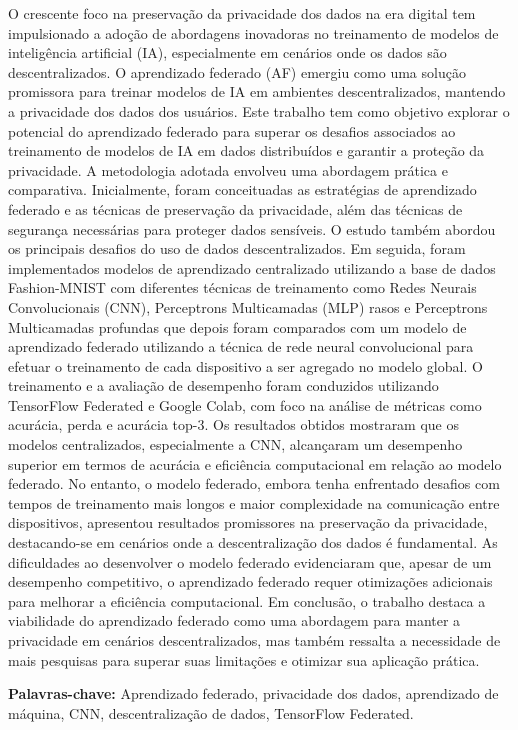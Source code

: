 \begin{resumo}

O crescente foco na preservação da privacidade dos dados na era digital tem impulsionado a adoção de abordagens inovadoras no treinamento de modelos de inteligência artificial (IA), especialmente em cenários onde os dados são descentralizados. O aprendizado federado (AF) emergiu como uma solução promissora para treinar modelos de IA em ambientes descentralizados, mantendo a privacidade dos dados dos usuários. Este trabalho tem como objetivo explorar o potencial do aprendizado federado para superar os desafios associados ao treinamento de modelos de IA em dados distribuídos e garantir a proteção da privacidade. A metodologia adotada envolveu uma abordagem prática e comparativa. Inicialmente, foram conceituadas as estratégias de aprendizado federado e as técnicas de preservação da privacidade, além das técnicas de segurança necessárias para proteger dados sensíveis. O estudo também abordou os principais desafios do uso de dados descentralizados. Em seguida, foram implementados modelos de aprendizado centralizado utilizando a base de dados Fashion-MNIST com diferentes técnicas de treinamento como Redes Neurais Convolucionais (CNN), Perceptrons Multicamadas (MLP) rasos e Perceptrons Multicamadas profundas que depois foram comparados com um modelo de aprendizado federado utilizando a técnica de rede neural convolucional para efetuar o treinamento de cada dispositivo a ser agregado no modelo global. O treinamento e a avaliação de desempenho foram conduzidos utilizando TensorFlow Federated e Google Colab, com foco na análise de métricas como acurácia, perda e acurácia top-3. Os resultados obtidos mostraram que os modelos centralizados, especialmente a CNN, alcançaram um desempenho superior em termos de acurácia e eficiência computacional em relação ao modelo federado. No entanto, o modelo federado, embora tenha enfrentado desafios com tempos de treinamento mais longos e maior complexidade na comunicação entre dispositivos, apresentou resultados promissores na preservação da privacidade, destacando-se em cenários onde a descentralização dos dados é fundamental. As dificuldades ao desenvolver o modelo federado evidenciaram que, apesar de um desempenho competitivo, o aprendizado federado requer otimizações adicionais para melhorar a eficiência computacional. Em conclusão, o trabalho destaca a viabilidade do aprendizado federado como uma abordagem para manter a privacidade em cenários descentralizados, mas também ressalta a necessidade de mais pesquisas para superar suas limitações e otimizar sua aplicação prática.

\vspace{\onelineskip}
    
\noindent
\textbf{Palavras-chave:} Aprendizado federado, privacidade dos dados, aprendizado de máquina, CNN, descentralização de dados, TensorFlow Federated.
\end{resumo}